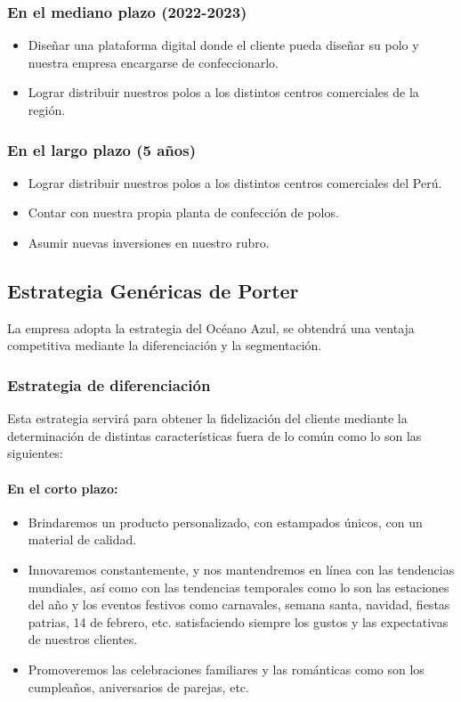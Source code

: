 \documentclass[a4paper,openright,12pt]{book}
\begin{document}
\subsubsection{En el mediano plazo (2022-2023)}
\begin{itemize}
\item Diseñar una plataforma digital donde el cliente pueda diseñar su polo y nuestra empresa encargarse de confeccionarlo.
\item Lograr distribuir nuestros polos a los distintos centros comerciales de la región.
\end{itemize}

\subsubsection{En el largo plazo (5 años)}
\begin{itemize}
\item Lograr distribuir nuestros polos a los distintos centros comerciales del Perú.
\item Contar con nuestra propia planta de confección de polos.
\item Asumir nuevas inversiones en nuestro rubro.
\end{itemize}

\subsection{Estrategia Genéricas de Porter}
La empresa adopta la estrategia del Océano Azul, se obtendrá una ventaja competitiva mediante la diferenciación y la segmentación.

\subsubsection{Estrategia de diferenciación}
Esta estrategia servirá para obtener la fidelización del cliente mediante la determinación de distintas características fuera de lo común como lo son las siguientes:
\paragraph{En el corto plazo:}
\begin{itemize}
\item Brindaremos un producto personalizado, con estampados únicos, con un material de calidad.
\item Innovaremos constantemente, y nos mantendremos en línea con las tendencias mundiales, así como con las tendencias temporales como lo son las estaciones del año y los eventos festivos como carnavales, semana santa, navidad, fiestas patrias, 14 de febrero, etc. satisfaciendo siempre los gustos y las expectativas de nuestros clientes.
\item Promoveremos las celebraciones familiares y las románticas como son los cumpleaños, aniversarios de parejas, etc.
\end{itemize}
\end{document}
